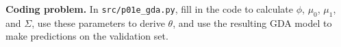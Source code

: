 \clearpage
\item {} \textbf{Coding problem.}
In \texttt{src/p01e\_gda.py}, fill in the code to
calculate $\phi$, $\mu_{0}$, $\mu_{1}$, and $\Sigma$, use these parameters
to derive $\theta$, and use the resulting GDA model to make predictions on the
validation set.

\ifnum{} {
  
} \fi
